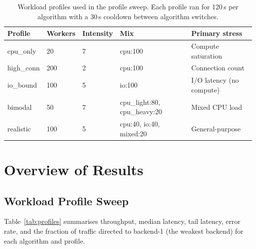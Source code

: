\documentclass[12pt]{article}
\begin{document}
\begin{table}[H]
\centering
\begin{tabular}{lllll}
\toprule
Profile & Workers & Intensity & Mix & Primary stress \\
\midrule
cpu\_only & 20 & 7 & cpu:100 & Compute saturation \\
high\_conn & 200 & 2 & cpu:100 & Connection count \\
io\_bound & 100 & 5 & io:100 & I/O latency (no compute) \\
bimodal & 50 & 7 & cpu\_light:80, cpu\_heavy:20 & Mixed CPU load \\
realistic & 100 & 5 & cpu:40, io:40, mixed:20 & General-purpose \\
\bottomrule
\end{tabular}
\caption{Workload profiles used in the profile sweep. Each profile ran for 120\,s
per algorithm with a 30\,s cooldown between algorithm switches.}
\end{table}

\section{Overview of Results}

\subsection{Workload Profile Sweep}

Table~\ref{tab:profiles} summarises throughput, median latency, tail latency,
error rate, and the fraction of traffic directed to backend-1 (the weakest
backend) for each algorithm and profile.
\end{document}
